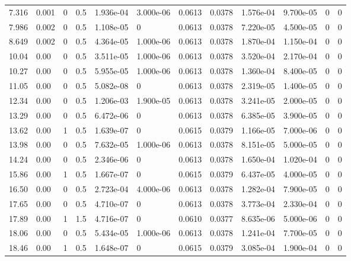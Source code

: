 \documentclass[preview]{standalone}
\begin{document}
{{\begin{tabular}{L{1.2cm}C{1.2cm} C{0.3cm}C{0.5cm} C{1.4cm}C{1.4cm} C{1.4cm}C{1.4cm} C{1.6cm}C{1.6cm} C{1.6cm}C{1.6cm}}
  7.316  &  0.001  & 0     & 0.5 &  1.936e-04  & 3.000e-06  &  0.0613&   0.0378& 1.576e-04 & 9.700e-05   &  0 & 0  \\ 
  7.986  &  0.002  & 0     & 0.5 &  1.108e-05  & 0  &  0.0613&   0.0378& 7.220e-05 & 4.500e-05   &  0 & 0  \\ 
  8.649  &  0.002  & 0     & 0.5 &  4.364e-05  & 1.000e-06  &  0.0613&   0.0378& 1.870e-04 & 1.150e-04   &  0 & 0  \\ 
  10.04  &  0.00  & 0     & 0.5 &  3.511e-05  & 1.000e-06  &  0.0613&   0.0378& 3.520e-04 & 2.170e-04   &  0 & 0  \\ 
  10.27  &  0.00  & 0     & 0.5 &  5.955e-05  & 1.000e-06  &  0.0613&   0.0378& 1.360e-04 & 8.400e-05   &  0 & 0  \\ 
  11.05  &  0.00  & 0     & 0.5 &  5.082e-08  & 0  &  0.0613&   0.0378& 2.319e-05 & 1.400e-05   &  0 & 0  \\ 
  12.34  &  0.00  & 0     & 0.5 &  1.206e-03  & 1.900e-05  &  0.0613&   0.0378& 3.241e-05 & 2.000e-05   &  0 & 0  \\ 
  13.29  &  0.00  & 0     & 0.5 &  6.472e-06  & 0  &  0.0613&   0.0378& 6.385e-05 & 3.900e-05   &  0 & 0  \\ 
  13.62  &  0.00  & 1     & 0.5 &  1.639e-07  & 0  &  0.0615&   0.0379& 1.166e-05 & 7.000e-06   &  0 & 0  \\ 
  13.98  &  0.00  & 0     & 0.5 &  7.632e-05  & 1.000e-06  &  0.0613&   0.0378& 8.151e-05 & 5.000e-05   &  0 & 0  \\ 
  14.24  &  0.00  & 0     & 0.5 &  2.346e-06  & 0  &  0.0613&   0.0378& 1.650e-04 & 1.020e-04   &  0 & 0  \\ 
  15.86  &  0.00  & 1     & 0.5 &  1.667e-07  & 0  &  0.0615&   0.0379& 6.437e-05 & 4.000e-05   &  0 & 0  \\ 
  16.50  &  0.00  & 0     & 0.5 &  2.723e-04  & 4.000e-06  &  0.0613&   0.0378& 1.282e-04 & 7.900e-05   &  0 & 0  \\ 
  17.65  &  0.00  & 0     & 0.5 &  4.710e-07  & 0  &  0.0613&   0.0378& 3.773e-04 & 2.330e-04   &  0 & 0  \\ 
  17.89  &  0.00  & 1     & 1.5 &  4.716e-07  & 0  &  0.0610&   0.0377& 8.635e-06 & 5.000e-06   &  0 & 0  \\ 
  18.06  &  0.00  & 0     & 0.5 &  5.434e-05  & 1.000e-06  &  0.0613&   0.0378& 1.241e-04 & 7.700e-05   &  0 & 0  \\ 
  18.46  &  0.00  & 1     & 0.5 &  1.648e-07  & 0  &  0.0615&   0.0379& 3.085e-04 & 1.900e-04   &  0 & 0  \\ 

\end{tabular}}}
\end{document}
